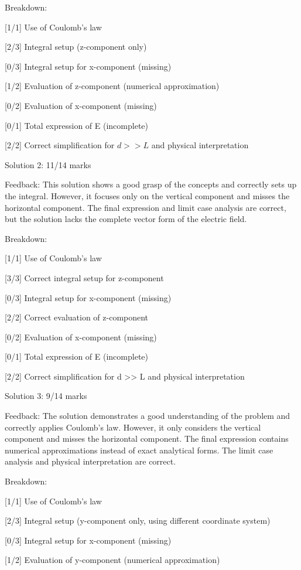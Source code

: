 \documentclass[a4paper,11pt]{article}
\begin{document}
Breakdown:

[1/1] Use of Coulomb's law

[2/3] Integral setup (z-component only)

[0/3] Integral setup for x-component (missing)

[1/2] Evaluation of z-component (numerical approximation)

[0/2] Evaluation of x-component (missing)

[0/1] Total expression of E (incomplete)

[2/2] Correct simplification for \(d >> L\) and physical interpretation

Solution 2: 11/14 marks

Feedback: This solution shows a good grasp of the concepts and correctly sets up the integral. However, it focuses only on the vertical component and misses the horizontal component. The final expression and limit case analysis are correct, but the solution lacks the complete vector form of the electric field.

Breakdown:

[1/1] Use of Coulomb's law

[3/3] Correct integral setup for z-component

[0/3] Integral setup for x-component (missing)

[2/2] Correct evaluation of z-component

[0/2] Evaluation of x-component (missing)

[0/1] Total expression of E (incomplete)

[2/2] Correct simplification for d >> L and physical interpretation

Solution 3: 9/14 marks

Feedback: The solution demonstrates a good understanding of the problem and correctly applies Coulomb's law. However, it only considers the vertical component and misses the horizontal component. The final expression contains numerical approximations instead of exact analytical forms. The limit case analysis and physical interpretation are correct.

Breakdown:

[1/1] Use of Coulomb's law

[2/3] Integral setup (y-component only, using different coordinate system)

[0/3] Integral setup for x-component (missing)

[1/2] Evaluation of y-component (numerical approximation)
\end{document}

